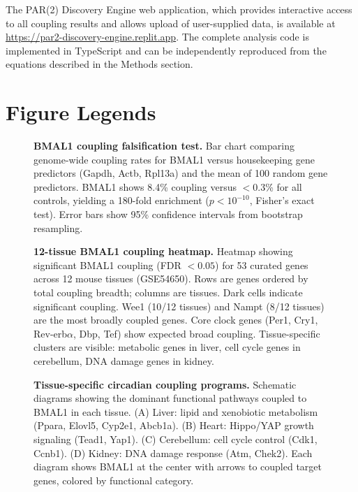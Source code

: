 \documentclass[11pt,letterpaper]{article}
\begin{document}
The PAR(2) Discovery Engine web application, which provides interactive access to all coupling results and allows upload of user-supplied data, is available at \url{https://par2-discovery-engine.replit.app}. The complete analysis code is implemented in TypeScript and can be independently reproduced from the equations described in the Methods section.

\section{Figure Legends}

\begin{figure}[H]
\caption{\textbf{BMAL1 coupling falsification test.} Bar chart comparing genome-wide coupling rates for BMAL1 versus housekeeping gene predictors (Gapdh, Actb, Rpl13a) and the mean of 100 random gene predictors. BMAL1 shows 8.4\% coupling versus $<$0.3\% for all controls, yielding a 180-fold enrichment ($p < 10^{-10}$, Fisher's exact test). Error bars show 95\% confidence intervals from bootstrap resampling.}
\label{fig:falsification}
\end{figure}

\begin{figure}[H]
\caption{\textbf{12-tissue BMAL1 coupling heatmap.} Heatmap showing significant BMAL1 coupling (FDR $< 0.05$) for 53 curated genes across 12 mouse tissues (GSE54650). Rows are genes ordered by total coupling breadth; columns are tissues. Dark cells indicate significant coupling. Wee1 (10/12 tissues) and Nampt (8/12 tissues) are the most broadly coupled genes. Core clock genes (Per1, Cry1, Rev-erb$\alpha$, Dbp, Tef) show expected broad coupling. Tissue-specific clusters are visible: metabolic genes in liver, cell cycle genes in cerebellum, DNA damage genes in kidney.}
\label{fig:heatmap}
\end{figure}

\begin{figure}[H]
\caption{\textbf{Tissue-specific circadian coupling programs.} Schematic diagrams showing the dominant functional pathways coupled to BMAL1 in each tissue. (A) Liver: lipid and xenobiotic metabolism (Ppara, Elovl5, Cyp2e1, Abcb1a). (B) Heart: Hippo/YAP growth signaling (Tead1, Yap1). (C) Cerebellum: cell cycle control (Cdk1, Ccnb1). (D) Kidney: DNA damage response (Atm, Chek2). Each diagram shows BMAL1 at the center with arrows to coupled target genes, colored by functional category.}
\label{fig:programs}
\end{figure}
\end{document}

